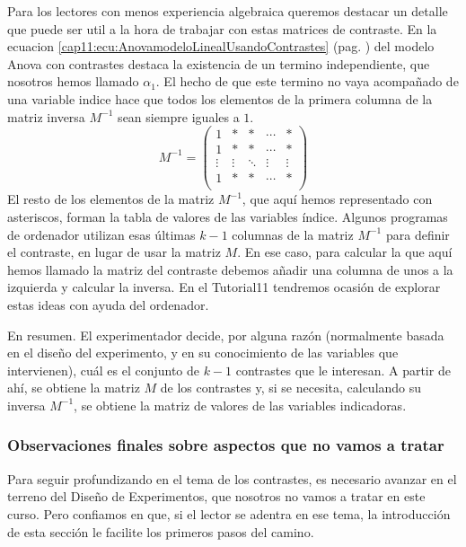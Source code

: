 Para los lectores con menos experiencia algebraica queremos destacar un detalle que puede ser util a la hora de trabajar con estas matrices de contraste. En la ecuacion \ref{cap11:ecu:AnovamodeloLinealUsandoContrastes} (pag. \pageref{cap11:ecu:AnovamodeloLinealUsandoContrastes}) del modelo Anova con contrastes destaca la existencia de un termino independiente, que nosotros hemos llamado $\alpha_1 $. El hecho de que este termino no vaya acompañado de una variable indice hace que todos los elementos de la primera columna de la matriz inversa $M^{-1}$ sean siempre iguales a $1$.
\[
M^{-1}
=
\left(
\begin{array}{c|ccccc}
1 & * & * &\cdots&*\\
1 & * & * &\cdots&*\\
\vdots & \vdots & \ddots &\vdots&\vdots\\
1 & * & * &\cdots&*\\
\end{array}
\right)
\]
El resto de los elementos de la matriz $M^{-1}$, que aquí hemos representado con asteriscos, forman la tabla de valores de las variables índice. Algunos programas de ordenador utilizan esas últimas $k-1$ columnas de la matriz $M^{-1}$ para definir el contraste, en lugar de usar la matriz $M$. En ese caso, para calcular la que aquí hemos llamado la matriz del contraste debemos añadir una columna de unos a la izquierda y calcular la inversa. En el Tutorial11 tendremos ocasión de explorar estas ideas con ayuda del ordenador.

En resumen. El experimentador decide, por alguna razón (normalmente basada en el diseño del experimento, y en su conocimiento de las variables que intervienen), cuál es el conjunto de $k-1$ contrastes  que le interesan. A partir de ahí, se obtiene la matriz $M$ de los contrastes y, si se necesita,  calculando su inversa $M^{-1}$, se obtiene la matriz de valores de las variables indicadoras.

\subsubsection{Observaciones finales sobre aspectos que no vamos a tratar}

Para seguir profundizando en el tema de los contrastes, es necesario avanzar en el terreno del Diseño de Experimentos, que nosotros no vamos a tratar en este curso. Pero confiamos en que, si el lector se adentra en ese tema, la introducción de esta sección le facilite los primeros pasos del camino.


